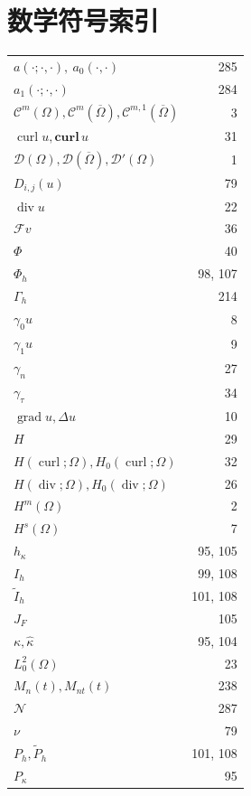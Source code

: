 \chapter*{数学符号索引}
\label{chap:mathematical-symbol-index}
\small
\noindent
\begin{minipage}[t]{0.48\textwidth}
\begin{tabular}{@{}lr@{}}
$a(\cdot;\cdot,\cdot),\ a_0(\cdot,\cdot)$ & 285\\
$a_1(\cdot;\cdot,\cdot)$ & 284\\
$\mathcal C^m(\Omega),\mathcal C^m(\overline\Omega),\mathcal C^{m,1}(\overline\Omega)$ & 3\\
$\operatorname{curl}u,\mathbf{curl}\,u$ & 31\\
$\mathcal D(\Omega),\mathcal D(\overline\Omega),\mathcal D'(\Omega)$ & 1\\
$D_{i,j}(u)$ & 79\\
$\operatorname{div}u$ & 22\\
$\mathcal Fv$ & 36\\
$\Phi$ & 40\\
$\Phi_h$ & 98, 107\\
$\Gamma_h$ & 214\\
$\gamma_0u$ & 8\\
$\gamma_1u$ & 9\\
$\gamma_n$ & 27\\
$\gamma_\tau$ & 34\\
$\operatorname{grad}u,\Delta u$ & 10\\
$H$ & 29\\
$H(\operatorname{curl};\Omega),H_0(\operatorname{curl};\Omega)$ & 32\\
$H(\operatorname{div};\Omega),H_0(\operatorname{div};\Omega)$ & 26\\
$H^m(\Omega)$ & 2\\
$H^s(\Omega)$ & 7\\
$h_\kappa$ & 95, 105\\
$I_h$ & 99, 108\\
$\widetilde I_h$ & 101, 108\\
$J_F$ & 105\\
$\kappa,\widehat\kappa$ & 95, 104\\
$L_0^2(\Omega)$ & 23\\
$M_n(t),M_{nt}(t)$ & 238\\
$\mathcal N$ & 287\\
$\nu$ & 79\\
$P_h,\widetilde P_h$ & 101, 108\\
$P_\kappa$ & 95\\
\end{tabular}
\end{minipage}\hfill
